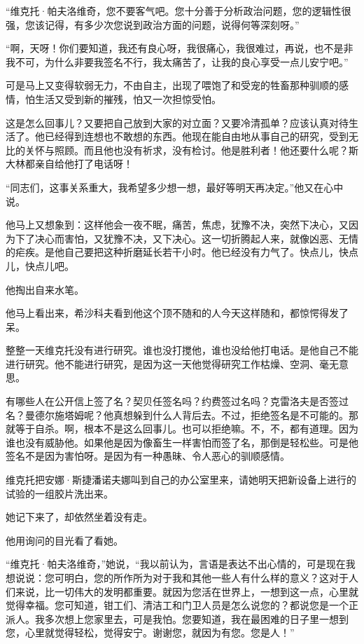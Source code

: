 “维克托·帕夫洛维奇，您不要客气吧。您十分善于分析政治问题，您的逻辑性很强，您该记得，有多少次您说到政治方面的问题，说得何等深刻呀。”

“啊，天呀！你们要知道，我还有良心呀，我很痛心，我很难过，再说，也不是非我不可，为什么非要我签名不行，我太痛苦了，让我的良心享受一点儿安宁吧。”

可是马上又变得软弱无力，不由自主，出现了喂饱了和受宠的牲畜那种驯顺的感情，怕生活又受到新的摧残，怕又一次担惊受怕。

这是怎么回事儿？又要把自己放到大家的对立面？又要冷清孤单？应该认真对待生活了。他已经得到连想也不敢想的东西。他现在能自由地从事自己的研究，受到无比的关怀与照顾。而且他也没有祈求，没有检讨。他是胜利者！他还要什么呢？斯大林都亲自给他打了电话呀！

“同志们，这事关系重大，我希望多少想一想，最好等明天再决定。”他又在心中说。

他马上又想象到：这样他会一夜不眠，痛苦，焦虑，犹豫不决，突然下决心，又因为下了决心而害怕，又犹豫不决，又下决心。这一切折腾起人来，就像凶恶、无情的疟疾。是他自己要把这种折磨延长若干小时。他已经没有力气了。快点儿，快点儿，快点儿吧。

他掏出自来水笔。

他马上看出来，希沙科夫看到他这个顶不随和的人今天这样随和，都惊愕得发了呆。

整整一天维克托没有进行研究。谁也没打搅他，谁也没给他打电话。是他自己不能进行研究。他不能进行研究，是因为这一天他觉得研究工作枯燥、空洞、毫无意思。

有哪些人在公开信上签了名？契贝任签名吗？约费签过名吗？克雷洛夫是否签过名？曼德尔施塔姆呢？他真想躲到什么人背后去。不过，拒绝签名是不可能的。那就等于自杀。啊，根本不是这么回事儿。也可以拒绝嘛。不，不，都有道理。因为谁也没有威胁他。如果他是因为像畜生一样害怕而签了名，那倒是轻松些。可是他签名不是因为害怕呀。是因为有一种愚昧、令人恶心的驯顺感情。

维克托把安娜·斯捷潘诺夫娜叫到自己的办公室里来，请她明天把新设备上进行的试验的一组胶片洗出来。

她记下来了，却依然坐着没有走。

他用询问的目光看了看她。

“维克托·帕夫洛维奇，”她说，“我以前认为，言语是表达不出心情的，可是现在我想说说：您可明白，您的所作所为对于我和其他一些人有什么样的意义？这对于人们来说，比一切伟大的发明都重要。就因为您活在世界上，一想到这一点，心里就觉得幸福。您可知道，钳工们、清洁工和门卫人员是怎么说您的？都说您是一个正派人。我多次想上您家里去，可是我怕。您要知道，我在最困难的日子里一想到您，心里就觉得轻松，觉得安宁。谢谢您，就因为有您。您是人！”

